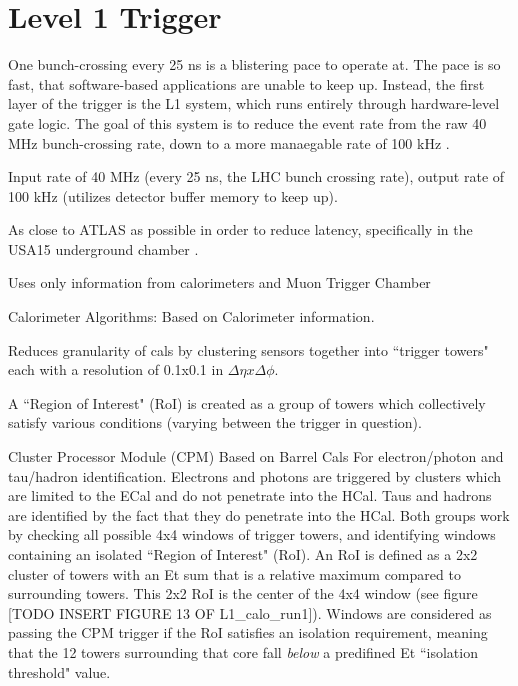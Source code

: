 \section{Level 1 Trigger}
    One bunch-crossing every 25 ns is a blistering pace to operate at.
    The pace is so fast, that software-based applications are unable to keep up.
    Instead, the first layer of the trigger is the L1 system, which runs entirely through hardware-level gate logic.
    The goal of this system is to reduce the event rate from the raw 40 MHz bunch-crossing rate, down to a more manaegable rate of 100 kHz \cite{trigger_run2}.
    
    

Input rate of 40 MHz (every 25 ns, the LHC bunch crossing rate), output rate of 100 kHz (utilizes detector buffer memory to keep up).

As close to ATLAS as possible in order to reduce latency, specifically in the USA15 underground chamber \cite{trigger_tdr}.


Uses only information from calorimeters and Muon Trigger Chamber


Calorimeter Algorithms: \cite{L1_calo_run1}
    Based on Calorimeter information.

    Reduces granularity of cals by clustering sensors together into ``trigger towers" each with a resolution of 0.1x0.1 in $\Delta \eta x \Delta \phi$.

    A ``Region of Interest" (RoI) is created as a group of towers which collectively satisfy various conditions (varying between the trigger in question).

    Cluster Processor Module (CPM)
        Based on Barrel Cals
        For electron/photon and tau/hadron identification.
        Electrons and photons are triggered by clusters which are limited to the ECal and do not penetrate into the HCal.
        Taus and hadrons are identified by the fact that they do penetrate into the HCal.
        Both groups work by checking all possible 4x4 windows of trigger towers, and identifying windows containing an isolated ``Region of Interest" (RoI).
        An RoI is defined as a 2x2 cluster of towers with an Et sum that is a relative maximum compared to surrounding towers.
        This 2x2 RoI is the center of the 4x4 window (see figure [TODO INSERT FIGURE 13 OF L1_calo_run1]).
        Windows are considered as passing the CPM trigger if the RoI satisfies an isolation requirement, meaning that the 12 towers surrounding that core fall \textit{below} a predifined Et ``isolation threshold" value.


